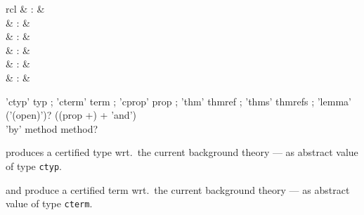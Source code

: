 \begin{isabellebody}
\begin{isamarkuptext}
\begin{description}
  \end{description}%
\end{isamarkuptext}%
\isamarkuptrue%
%
\endisatagmlref
{\isafoldmlref}%
%
\isadelimmlref
%
\endisadelimmlref
%
\isadelimmlantiq
%
\endisadelimmlantiq
%
\isatagmlantiq
%
\begin{isamarkuptext}%
\begin{matharray}{rcl}
  \hypertarget{ML antiquotation.ctyp}{\hyperlink{ML antiquotation.ctyp}{\mbox{}}} & : &  \\
  \hypertarget{ML antiquotation.cterm}{\hyperlink{ML antiquotation.cterm}{\mbox{}}} & : &  \\
  \hypertarget{ML antiquotation.cprop}{\hyperlink{ML antiquotation.cprop}{\mbox{}}} & : &  \\
  \hypertarget{ML antiquotation.thm}{\hyperlink{ML antiquotation.thm}{\mbox{}}} & : &  \\
  \hypertarget{ML antiquotation.thms}{\hyperlink{ML antiquotation.thms}{\mbox{}}} & : &  \\
  \hypertarget{ML antiquotation.lemma}{\hyperlink{ML antiquotation.lemma}{\mbox{}}} & : &  \\
  \end{matharray}

  \begin{rail}
  'ctyp' typ
  ;
  'cterm' term
  ;
  'cprop' prop
  ;
  'thm' thmref
  ;
  'thms' thmrefs
  ;
  'lemma' ('(open)')? ((prop +) + 'and') \\ 'by' method method?
  \end{rail}

  \begin{description}

  \item {} produces a certified type wrt.\ the
  current background theory --- as abstract value of type \verb|ctyp|.

  \item {} and  produce a
  certified term wrt.\ the current background theory --- as abstract
  value of type \verb|cterm|.


\end{description}
\end{isamarkuptext}
\end{isabellebody}
